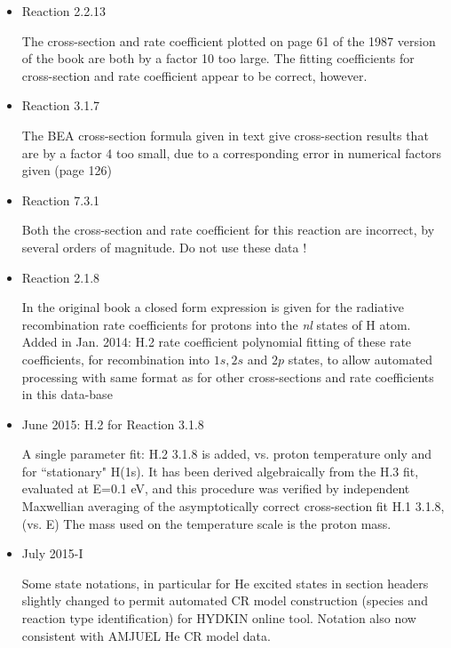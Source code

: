 \documentclass[12pt,dvipdfmx]{article}
\begin{document}
\begin{itemize}
cross-section and reaction rate of electron-impact process 2.1.3 (Chibisov) are both
a factor 10 too small.
Also Chibisov analytic formula for cross-section given in 1987 book:
factor 10 too small.
Not yet corrected here in fits.
(Can be done by a modification of coefficients $a_0$ and $b_0$)
The corresponding proton-impact data (3.1.3) seem to be correct.

\item{Reaction 2.2.13}

The cross-section and rate coefficient plotted on page 61 of the 1987 version of the book are both by
a factor 10 too large.
The fitting coefficients for cross-section and rate coefficient appear to be correct, however.

\item{Reaction 3.1.7}

The BEA cross-section formula given in text give cross-section results that are by a factor 4 too small,
due to a corresponding error in numerical factors given (page 126)

\item{Reaction 7.3.1}

Both the cross-section and rate coefficient for this reaction are incorrect, by several orders of magnitude.
Do not use these data !

\item{Reaction 2.1.8}

In the original book a closed form expression is given for the radiative recombination rate coefficients for protons
into the \emph{nl} states of H atom. Added in Jan. 2014:  H.2 rate coefficient polynomial fitting of these rate coefficients, for recombination into
$1s, 2s$ and $2p$ states, to allow
automated processing with same format as for other cross-sections and rate coefficients in this data-base

\item{June 2015: H.2 for Reaction 3.1.8}

A single parameter fit: H.2  3.1.8 is added, vs. proton temperature only and for ``stationary" H(1s). It has been derived
algebraically from the H.3 fit, evaluated at
E=0.1 eV, and this procedure was verified by independent Maxwellian averaging
of the asymptotically correct cross-section fit H.1  3.1.8, (vs. E)
The mass used on the temperature scale is the proton mass.

\item{July 2015-I}

Some state notations, in particular for He excited states in section headers slightly changed to permit automated CR
model construction (species and reaction type identification) for HYDKIN online tool. Notation also now consistent with
AMJUEL He CR model data.


\end{itemize}
\end{document}
